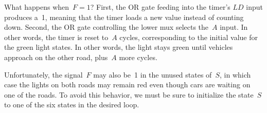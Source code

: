 What happens when~$F=1$?  First, the OR gate feeding into the timer's
$LD$ input produces a~1, meaning that the timer loads a new value
instead of counting down.  Second, the OR gate controlling the lower
mux selects the~$A$ input.  In other words, the timer is reset to~$A$
cycles, corresponding to the initial value for the green light states.
In other words, the light stays green until vehicles approach on 
the other road, plus~$A$ more cycles.

Unfortunately, the signal~$F$ may also be~1 in the unused states of~$S$,
in which case the lights on both roads may remain red even though cars
are waiting on one of the roads.  To avoid this behavior, we must be 
sure to initialize the state~$S$ to one of the six states in the
desired loop.

\pagebreak

